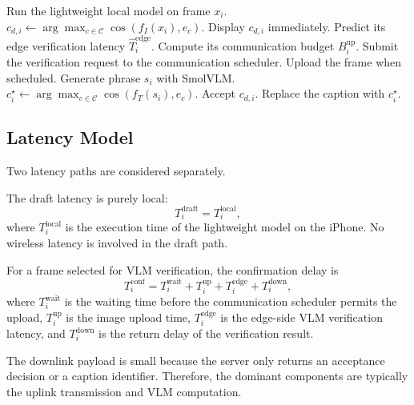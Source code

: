 \begin{algorithm}[t]
\caption{Local draft and edge verification}
\label{alg:verify}
\begin{algorithmic}[1]
\STATE Run the lightweight local model on frame $x_i$.
\STATE $c_{d,i}\leftarrow
\arg\max_{c\in\mathcal{C}}
\cos(f_I(x_i),e_c)$.
\STATE Display $c_{d,i}$ immediately.
    \STATE Predict its edge verification latency $\hat T_i^{\mathrm{edge}}$.
    \STATE Compute its communication budget $B_i^{\mathrm{up}}$.
    \STATE Submit the verification request to the communication scheduler.
    \STATE Upload the frame when scheduled.
    \STATE Generate phrase $s_i$ with SmolVLM.
    \STATE $c_i^\star\leftarrow
    \arg\max_{c\in\mathcal{C}}
    \cos(f_T(s_i),e_c)$.
        \STATE Accept $c_{d,i}$.
    \ELSE
        \STATE Replace the caption with $c_i^\star$.
    \ENDIF
\ENDIF
\end{algorithmic}
\end{algorithm}

\subsection{Latency Model}

Two latency paths are considered separately.

The draft latency is purely local:
\begin{equation}
T_{i}^{\mathrm{draft}}
=
T_{i}^{\mathrm{local}},
\end{equation}
where $T_{i}^{\mathrm{local}}$ is the execution time of the lightweight model
on the iPhone. No wireless latency is involved in the draft path.

For a frame selected for VLM verification, the confirmation delay is
\begin{equation}
T_i^{\mathrm{conf}}
=
T_i^{\mathrm{wait}}
+
T_i^{\mathrm{up}}
+
T_i^{\mathrm{edge}}
+
T_i^{\mathrm{down}},
\end{equation}
where $T_i^{\mathrm{wait}}$ is the waiting time before the communication
scheduler permits the upload, $T_i^{\mathrm{up}}$ is the image upload time,
$T_i^{\mathrm{edge}}$ is the edge-side VLM verification latency, and
$T_i^{\mathrm{down}}$ is the return delay of the verification result.

The downlink payload is small because the server only returns an acceptance
decision or a caption identifier. Therefore, the dominant components are
typically the uplink transmission and VLM computation.

